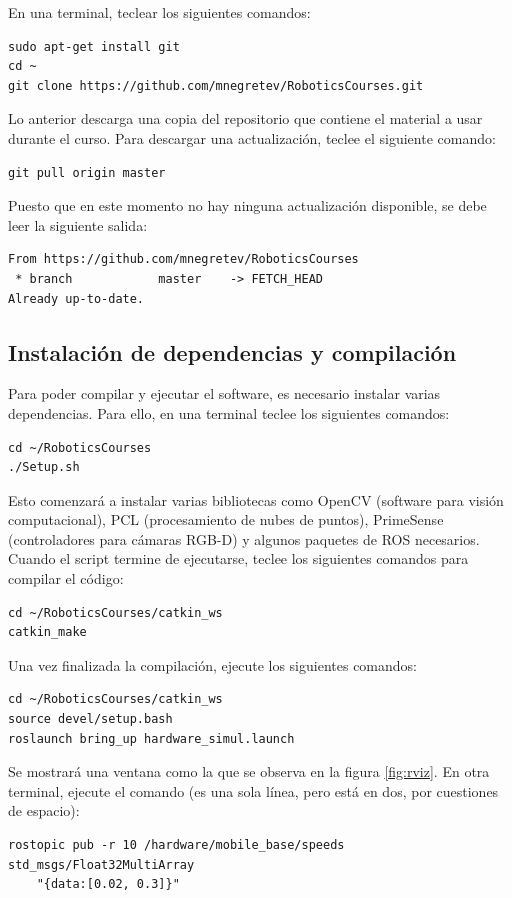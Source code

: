 \documentclass[letterpaper,12pt]{article}
\begin{document}
En una terminal, teclear los siguientes comandos:
\begin{verbatim}
sudo apt-get install git
cd ~
git clone https://github.com/mnegretev/RoboticsCourses.git
\end{verbatim}
Lo anterior descarga una copia del repositorio que contiene el material a usar durante el curso. Para descargar una actualización, teclee el siguiente comando:
\begin{verbatim}
git pull origin master
\end{verbatim}
Puesto que en este momento no hay ninguna actualización disponible, se debe leer la siguiente salida:
\begin{verbatim}
From https://github.com/mnegretev/RoboticsCourses
 * branch            master    -> FETCH_HEAD
Already up-to-date.
\end{verbatim}

\subsection{Instalación de dependencias y compilación}
Para poder compilar y ejecutar el software, es necesario instalar varias dependencias. Para ello, en una terminal teclee los siguientes comandos:
\begin{verbatim}
cd ~/RoboticsCourses
./Setup.sh
\end{verbatim}

Esto comenzará a instalar varias bibliotecas como OpenCV (software para visión computacional), PCL (procesamiento de nubes de puntos), PrimeSense (controladores para cámaras RGB-D) y algunos paquetes de ROS necesarios. Cuando el script termine de ejecutarse, teclee los siguientes comandos para compilar el código:
\begin{verbatim}
cd ~/RoboticsCourses/catkin_ws
catkin_make
\end{verbatim}

Una vez finalizada la compilación, ejecute los siguientes comandos:

\begin{verbatim}
cd ~/RoboticsCourses/catkin_ws
source devel/setup.bash
roslaunch bring_up hardware_simul.launch
\end{verbatim}

Se mostrará una ventana como la que se observa en la figura \ref{fig:rviz}. En otra terminal, ejecute el comando (es una sola línea, pero está en dos, por cuestiones de espacio):
\begin{verbatim}
rostopic pub -r 10 /hardware/mobile_base/speeds std_msgs/Float32MultiArray 
    "{data:[0.02, 0.3]}"
\end{verbatim}
\end{document}
